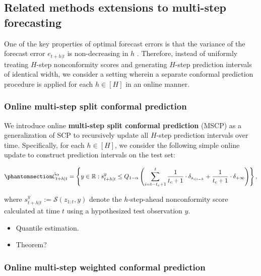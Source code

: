 \documentclass[
  11pt,
  a4paper,
]{article}
\theoremstyle{plain}
\theoremstyle{plain}
\theoremstyle{remark}
\begin{document}
\subsection{Related methods extensions to multi-step
forecasting}\label{sec-ext}

One of the key properties of optimal forecast errors is that the
variance of the forecast error \(e_{t+h|t}\) is non-decreasing in \(h\)
\autocite{diebold1996,patton2007}. Therefore, instead of uniformly
treating \(H\)-step nonconformity scores and generating \(H\)-step
prediction intervals of identical width, we consider a setting wherein a
separate conformal prediction procedure is applied for each
\(h \in [H]\) in an online manner.

\subsubsection{Online multi-step split conformal
prediction}\label{online-multi-step-split-conformal-prediction}

We introduce online \textbf{multi-step split conformal prediction}
(MSCP) as a generalization of SCP to recursively update all \(H\)-step
prediction intervals over time. Specifically, for each \(h \in [H]\), we
consider the following simple online update to construct prediction
intervals on the test set:

\begin{equation}\phantomsection\label{eq-mscp}{
\hat{\mathcal{C}}_{t+h|t}^{\alpha} = \left\{y\in\mathbb{R}: s_{t+h|t}^{y} \leq Q_{1-\alpha}\left(\sum_{i=t-t_c+1}^{t}\frac{1}{t_c+1}\cdot\delta_{s_{i|i-h}}+\frac{1}{t_c+1}\cdot\delta_{+\infty}\right)\right\},
}\end{equation}

where \(s_{t+h|t}^{y}:=\mathcal{S}(z_{1:t}, y)\) denote the
\(h\)-step-ahead nonconformity score calculated at time \(t\) using a
hypothesized test observation \(y\).

\begin{itemize}
\item
  Quantile estimation.
\item
  Theorem?
\end{itemize}

\subsubsection{Online multi-step weighted conformal
prediction}\label{online-multi-step-weighted-conformal-prediction}
\end{document}
